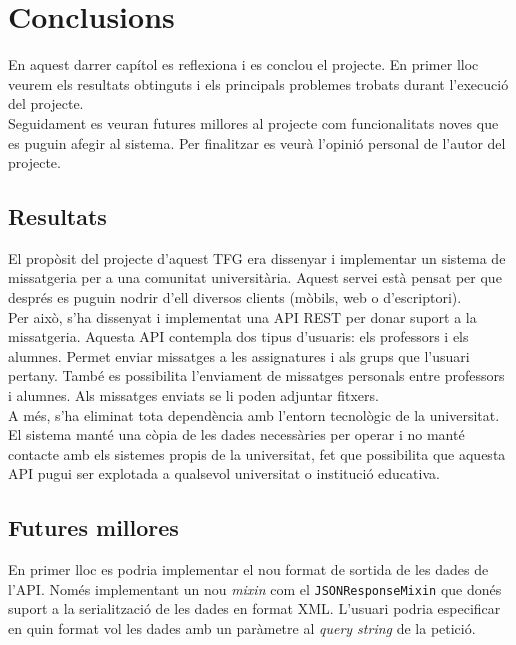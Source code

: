 
\chapter{Conclusions}\label{conclusions}

En aquest darrer capítol es reflexiona i es conclou el projecte. En primer lloc veurem els resultats obtinguts i els principals problemes trobats durant l'execució del projecte.\\

Seguidament es veuran futures millores al projecte com funcionalitats noves que es puguin afegir al sistema. Per finalitzar es veurà l'opinió personal de l'autor del projecte.\\

\section{Resultats}

El propòsit del projecte d'aquest \ac{TFG} era dissenyar i implementar un sistema de missatgeria per a una comunitat universitària. Aquest servei està pensat per que després es puguin nodrir d'ell diversos clients (mòbils, web o d'escriptori).\\

Per això, s'ha dissenyat i implementat una \ac{API} \ac{REST} per donar suport a la missatgeria. Aquesta \ac{API} contempla dos tipus d'usuaris: els professors i els alumnes. Permet enviar missatges a les assignatures i als grups que l'usuari pertany. També es possibilita l'enviament de missatges personals entre professors i alumnes. Als missatges enviats se li poden adjuntar fitxers.\\

A més, s'ha eliminat tota dependència amb l'entorn tecnològic de la universitat. El sistema manté una còpia de les dades necessàries per operar i no manté contacte amb els sistemes propis de la universitat, fet que possibilita que aquesta \ac{API} pugui ser explotada a qualsevol universitat o institució educativa.\\

\section{Futures millores}

En primer lloc es podria implementar el nou format de sortida de les dades de l'\ac{API}. Només implementant un nou \emph{mixin} com el \texttt{JSONResponseMixin} que donés suport a la serialització de les dades en format \ac{XML}. L'usuari podria especificar en quin format vol les dades amb un paràmetre al \emph{query string} de la petició. \\

